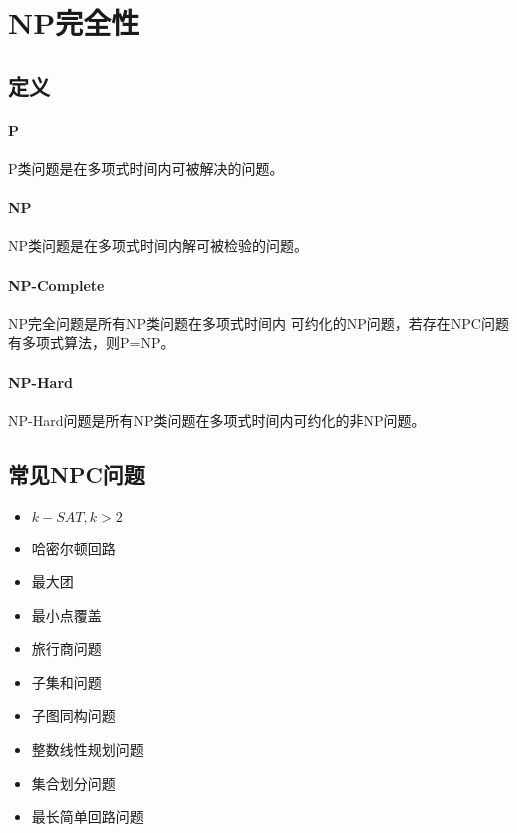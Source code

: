 \section{NP完全性}
\subsection{定义}
\paragraph{P} P类问题是在多项式时间内可被解决的问题。
\paragraph{NP} NP类问题是在多项式时间内解可被检验的问题。
\paragraph{NP-Complete} NP完全问题是所有NP类问题在多项式时间内
可约化的NP问题，若存在NPC问题有多项式算法，则P=NP。
\paragraph{NP-Hard}NP-Hard问题是所有NP类问题在多项式时间内可约化的非NP问题。
\subsection{常见NPC问题}
\begin{itemize}
    \item $k-SAT,k>2$
    \item 哈密尔顿回路
    \item 最大团
    \item 最小点覆盖
    \item 旅行商问题
    \item 子集和问题
    \item 子图同构问题
    \item 整数线性规划问题
    \item 集合划分问题
    \item 最长简单回路问题
\end{itemize}
